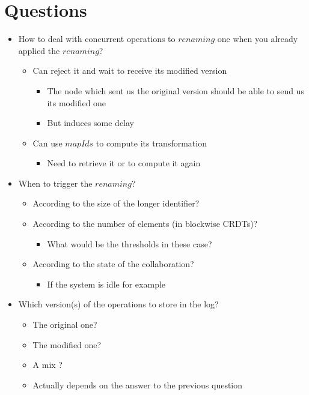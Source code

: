 \documentclass[a4paper]{article}
\begin{document}
\section{Questions}

\begin{itemize}
  \item How to deal with concurrent operations to $renaming$ one when you already applied the $renaming$?
  \begin{itemize}
    \item Can reject it and wait to receive its modified version
    \begin{itemize}
      \item The node which sent us the original version should be able to send us its modified one
      \item But induces some delay
    \end{itemize}
    \item Can use $mapIds$ to compute its transformation
    \begin{itemize}
      \item Need to retrieve it or to compute it again
    \end{itemize}
  \end{itemize}
  \item When to trigger the $renaming$?
  \begin{itemize}
    \item According to the size of the longer identifier?
    \item According to the number of elements (in blockwise \acp{CRDT})?
    \begin{itemize}
      \item What would be the thresholds in these case?
    \end{itemize}
    \item According to the state of the collaboration?
    \begin{itemize}
      \item If the system is idle for example
    \end{itemize}
  \end{itemize}
  \item Which version(s) of the operations to store in the log?
  \begin{itemize}
    \item The original one?
    \item The modified one?
    \item A mix ?
    \item Actually depends on the answer to the previous question
  \end{itemize}
\end{itemize}


\end{document}
